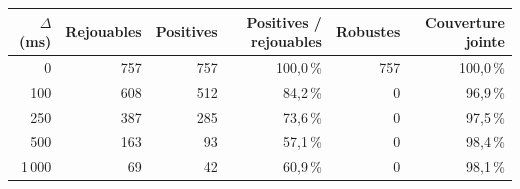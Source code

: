 \begin{tabular}{@{}rrrrrr@{}}
\toprule
$\Delta$ (ms) & Rejouables & Positives & Positives / rejouables & Robustes & Couverture jointe\\
\midrule
0 & 757 & 757 & 100,0\,\% & 757 & 100,0\,\%\\
100 & 608 & 512 & 84,2\,\% & 0 & 96,9\,\%\\
250 & 387 & 285 & 73,6\,\% & 0 & 97,5\,\%\\
500 & 163 & 93 & 57,1\,\% & 0 & 98,4\,\%\\
1\,000 & 69 & 42 & 60,9\,\% & 0 & 98,1\,\%\\
\bottomrule
\end{tabular}
